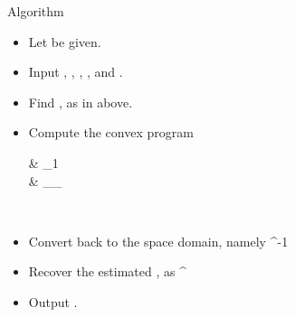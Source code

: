 \Result
{Algorithm}
{
\begin {itemize}
%
\item Let  be given.
%
\item Input ,
,
,
,
and .
%
\item Find ,  as in above.
%
\item Compute the convex program
%
 {
\leftarrow \begin {cases}
 &  _1 \\
%
 \;  \quad &  _\infty \leq \g_{} \\
\end {cases} \\
}
%
\item Convert  back to the space domain, namely
%
 {
\leftarrow {}^{-1}  \\
}
%
\item Recover the estimated , as
%
 {
\leftarrow {}  ^\dagger \\
}
%
\item Output .
%
\end {itemize}
}



